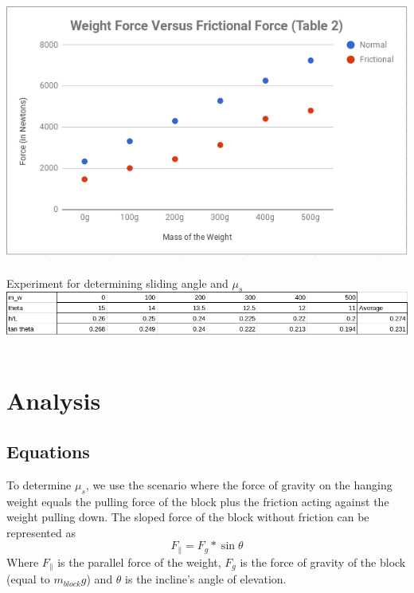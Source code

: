 \documentclass[12pt]{article}
\begin{document}
        \includegraphics[scale=0.75]{GraphWeightVsFriction2.png} \\ \\
        {\large Experiment for determining sliding angle and $\mu_s$} \\
        \includegraphics[scale=0.6]{DataTable3.png} \\ \\


    \section{Analysis}
        \subsection{Equations}
            \par To determine $\mu_s$, we use the scenario where the force of
            gravity on the hanging weight equals the pulling force of the
            block plus the friction acting against the weight pulling down.
            The sloped force of the block without friction can be represented
            as
            \begin{equation}
                F_{\parallel} = F_g * \sin{\theta}
            \end{equation}
            Where $F_{\parallel}$ is the parallel force of the weight, $F_g$
            is the force of gravity of the block (equal to $m_{block}g$) and
            $\theta$ is the incline's angle of elevation.
\end{document}
